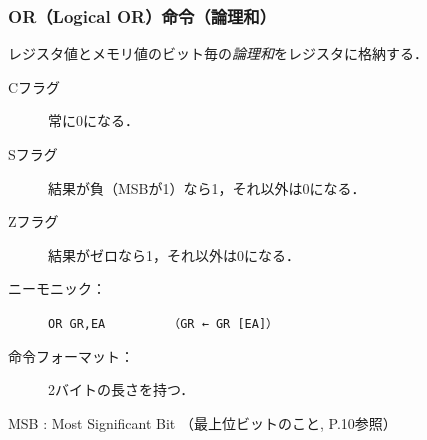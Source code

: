 \documentclass{beamer}                 %
\begin{document}
\begin{frame}
  \frametitle{OR（Logical OR）命令（論理和）}
  レジスタ値とメモリ値のビット毎の\emph{論理和}をレジスタに格納する．
  \vfill
  \begin{description}
  \item[Cフラグ] 常に0になる．
  \item[Sフラグ] 結果が負（MSBが1）なら1，それ以外は0になる．
  \item[Zフラグ] 結果がゼロなら1，それ以外は0になる．
    \vfill
  \item[ニーモニック：]\texttt{OR GR,EA}~~~~~~~~~\texttt{（GR ← GR \textbar{} [EA]）}
    \vfill
  \item[命令フォーマット：] 2バイトの長さを持つ．\\
    {\small{}}
    \vfill
  \end{description}
  \vfill
  MSB : Most Significant Bit （最上位ビットのこと, P.10参照）
  \vfill
\end{frame}
\end{document}
